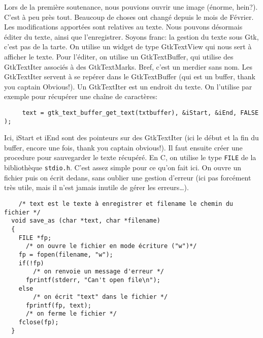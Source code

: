 \documentclass[a4paper,10pt]{report}
\begin{document}
Lors de la premi\`ere soutenance, nous pouvions ouvrir une image (\'enorme, hein?). C'est \`a peu pr\`es tout.
Beaucoup de choses ont chang\'e depuis le mois de F\'evrier.
Les modifications apport\'ees sont relatives au texte. Nous pouvons d\'esormais \'editer du texte, ainsi que l'enregistrer. Soyons franc: la gestion du texte sous Gtk, c'est pas de la tarte. On utilise un widget de type GtkTextView qui nous sert \`a afficher le texte. Pour l'\'editer, on utilise un GtkTextBuffer, qui utilise des GtkTextIter associ\'es \`a des GtkTextMarks. Bref, c'est un merdier sans nom.
Les GtkTextIter servent \`a se rep\'erer dans le GtkTextBuffer (qui est un buffer, thank you captain Obvious!). Un GtkTextIter est un endroit du texte. On l'utilise par exemple pour r\'ecup\'erer une cha\^ine de caract\`eres:
	\begin{lstlisting}
     text = gtk_text_buffer_get_text(txtbuffer), &iStart, &iEnd, FALSE );
	\end{lstlisting}
	Ici, iStart et iEnd sont des pointeurs sur des GtkTextIter (ici le d\'ebut et la fin du buffer, encore une fois, thank you captain obvious!).
	Il faut ensuite cr\'eer une procedure pour sauvegarder le texte r\'ecup\'er\'e. En C, on utilise le type \verb!FILE! de la biblioth\`eque \verb!stdio.h!. C'est assez simple pour ce qu'on fait ici. On ouvre un fichier puis on \'ecrit dedans, sans oublier une gestion d'erreur (ici pas forc\'ement tr\`es utile, mais il n'est jamais inutile de g\'erer les erreurs\ldots).
	\begin{lstlisting}
    /* text est le texte à enregistrer et filename le chemin du fichier */
  void save_as (char *text, char *filename)
  {
    FILE *fp;
      /* on ouvre le fichier en mode écriture ("w")*/
    fp = fopen(filename, "w");
    if(!fp)
        /* on renvoie un message d'erreur */
      fprintf(stderr, "Can't open file\n");
    else
        /* on écrit "text" dans le fichier */
      fprintf(fp, text);
      /* on ferme le fichier */
    fclose(fp);
  }
	\end{lstlisting}
\end{document}
